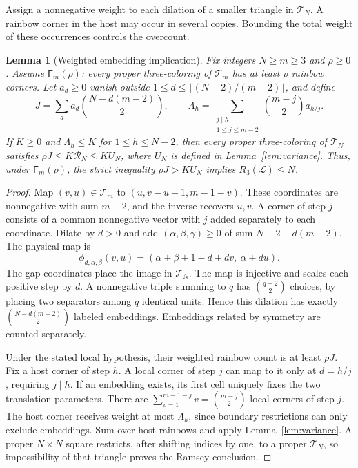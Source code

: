 \documentclass[11pt,a4paper]{article}
\newtheorem{lemma}[theorem]{Lemma}
\theoremstyle{definition}
\newcommand{\Lconf}{\mathcal L}
\newcommand{\Ttri}{\mathcal T}
\newcommand{\F}{\mathsf F}
\numberwithin{equation}{section}
\begin{document}
Assign a nonnegative weight to each dilation of a smaller triangle in $\Ttri_N$. A rainbow corner in the host may occur in several copies. Bounding the total weight of these occurrences controls the overcount.
\begin{lemma}[Weighted embedding implication]\label{lem:weighted}
	Fix integers $N\ge m\ge3$ and $\rho\ge0$. Assume $\F_m(\rho)$: every proper three-coloring of $\Ttri_m$ has at least $\rho$ rainbow corners. Let $a_d\ge0$ vanish outside $1\le d\le\lfloor(N-2)/(m-2)\rfloor$, and define
	\begin{equation}\label{eq:appendix-result-7}
J=\sum_d a_d\binom{N-d(m-2)}2,\qquad
	\Lambda_h=\sum_{\substack{j\mid h\\1\le j\le m-2}}\binom{m-j}2a_{h/j}.
\end{equation}
	If $K\ge0$ and $\Lambda_h\le K$ for $1\le h\le N-2$, then every proper three-coloring of $\Ttri_N$ satisfies $\rho J\le K\mathcal R_N\le KU_N$, where $U_N$ is defined in Lemma~\ref{lem:variance}. Thus, under $\F_m(\rho)$, the strict inequality $\rho J>KU_N$ implies $R_3(\Lconf)\le N$.
\end{lemma}

\begin{proof}
	Map $(v,u)\in\Ttri_m$ to $(u,v-u-1,m-1-v)$. These coordinates are nonnegative with sum $m-2$, and the inverse recovers $u,v$. A corner of step $j$ consists of a common nonnegative vector with $j$ added separately to each coordinate. Dilate by $d>0$ and add $(\alpha,\beta,\gamma)\ge0$ of sum $N-2-d(m-2)$. The physical map is
	\[
	\phi_{d,\alpha,\beta}(v,u)=(\alpha+\beta+1-d+dv,\ \alpha+du).
	\]
	The gap coordinates place the image in $\Ttri_N$. The map is injective and scales each positive step by $d$. A nonnegative triple summing to $q$ has $\binom{q+2}2$ choices, by placing two separators among $q$ identical units. Hence this dilation has exactly $\binom{N-d(m-2)}2$ labeled embeddings. Embeddings related by symmetry are counted separately.
	
	Under the stated local hypothesis, their weighted rainbow count is at least $\rho J$. Fix a host corner of step $h$. A local corner of step $j$ can map to it only at $d=h/j$, requiring $j\mid h$. If an embedding exists, its first cell uniquely fixes the two translation parameters. There are $\sum_{v=1}^{m-1-j}v=\binom{m-j}2$ local corners of step $j$. The host corner receives weight at most $\Lambda_h$, since boundary restrictions can only exclude embeddings. Sum over host rainbows and apply Lemma~\ref{lem:variance}. A proper $N\times N$ square restricts, after shifting indices by one, to a proper $\Ttri_N$, so impossibility of that triangle proves the Ramsey conclusion.
\end{proof}
\end{document}
